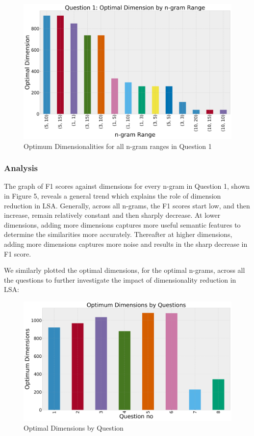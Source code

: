 \documentclass[10pt,letterpaper]{article}
\begin{document}
\begin{figure}[ht]
\begin{center}
\includegraphics[scale = 0.2]{img/Q1OptimumDimensions.png}
\end{center}
\caption{Optimum Dimensionalities for all n-gram ranges in Question 1}
\end{figure}

\subsubsection{Analysis}
The graph of F1 scores against dimensions for every n-gram in Question 1, shown in Figure 5, reveals a general trend which explains the role of dimension reduction in LSA. Generally, across all n-grams, the F1 scores start low, and then increase, remain relatively constant and then sharply decrease. At lower dimensions, adding more dimensions captures more useful semantic features to determine the similarities more accurately. Thereafter at higher dimensions, adding more dimensions captures more noise and results in the sharp decrease in F1 score.

We similarly plotted the optimal dimensions, for the optimal n-grams, across all the questions to further investigate the impact of dimensionality reduction in LSA: 

\begin{figure}[ht]
\begin{center}
\includegraphics[scale = 0.20]{img/OptimumDimensions.png}
\end{center}
\caption{Optimal Dimensions by Question}
\end{figure}
\end{document}
